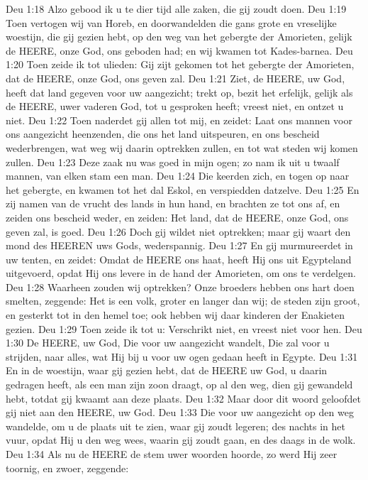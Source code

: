 Deu 1:18  Alzo gebood ik u te dier tijd alle zaken, die gij zoudt doen.
Deu 1:19  Toen vertogen wij van Horeb, en doorwandelden die gans grote en vreselijke woestijn, die gij gezien hebt, op den weg van het gebergte der Amorieten, gelijk de HEERE, onze God, ons geboden had; en wij kwamen tot Kades-barnea.
Deu 1:20  Toen zeide ik tot ulieden: Gij zijt gekomen tot het gebergte der Amorieten, dat de HEERE, onze God, ons geven zal.
Deu 1:21  Ziet, de HEERE, uw God, heeft dat land gegeven voor uw aangezicht; trekt op, bezit het erfelijk, gelijk als de HEERE, uwer vaderen God, tot u gesproken heeft; vreest niet, en ontzet u niet.
Deu 1:22  Toen naderdet gij allen tot mij, en zeidet: Laat ons mannen voor ons aangezicht heenzenden, die ons het land uitspeuren, en ons bescheid wederbrengen, wat weg wij daarin optrekken zullen, en tot wat steden wij komen zullen.
Deu 1:23  Deze zaak nu was goed in mijn ogen; zo nam ik uit u twaalf mannen, van elken stam een man.
Deu 1:24  Die keerden zich, en togen op naar het gebergte, en kwamen tot het dal Eskol, en verspiedden datzelve.
Deu 1:25  En zij namen van de vrucht des lands in hun hand, en brachten ze tot ons af, en zeiden ons bescheid weder, en zeiden: Het land, dat de HEERE, onze God, ons geven zal, is goed.
Deu 1:26  Doch gij wildet niet optrekken; maar gij waart den mond des HEEREN uws Gods, wederspannig.
Deu 1:27  En gij murmureerdet in uw tenten, en zeidet: Omdat de HEERE ons haat, heeft Hij ons uit Egypteland uitgevoerd, opdat Hij ons levere in de hand der Amorieten, om ons te verdelgen.
Deu 1:28  Waarheen zouden wij optrekken? Onze broeders hebben ons hart doen smelten, zeggende: Het is een volk, groter en langer dan wij; de steden zijn groot, en gesterkt tot in den hemel toe; ook hebben wij daar kinderen der Enakieten gezien.
Deu 1:29  Toen zeide ik tot u: Verschrikt niet, en vreest niet voor hen.
Deu 1:30  De HEERE, uw God, Die voor uw aangezicht wandelt, Die zal voor u strijden, naar alles, wat Hij bij u voor uw ogen gedaan heeft in Egypte.
Deu 1:31  En in de woestijn, waar gij gezien hebt, dat de HEERE uw God, u daarin gedragen heeft, als een man zijn zoon draagt, op al den weg, dien gij gewandeld hebt, totdat gij kwaamt aan deze plaats.
Deu 1:32  Maar door dit woord geloofdet gij niet aan den HEERE, uw God.
Deu 1:33  Die voor uw aangezicht op den weg wandelde, om u de plaats uit te zien, waar gij zoudt legeren; des nachts in het vuur, opdat Hij u den weg wees, waarin gij zoudt gaan, en des daags in de wolk.
Deu 1:34  Als nu de HEERE de stem uwer woorden hoorde, zo werd Hij zeer toornig, en zwoer, zeggende:
